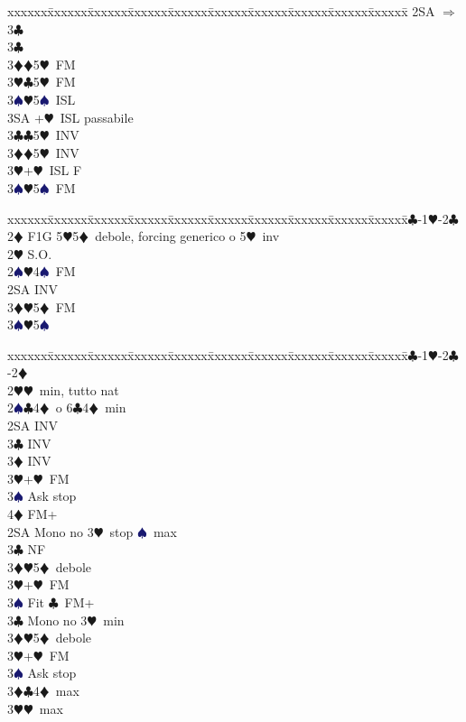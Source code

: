 \documentclass[a4paper,italian]{article}
\newcommand{\BC}{\textcolor{OliveGreen}{$\clubsuit$}}
\newcommand{\BD}{\textcolor{RedOrange}{$\vardiamondsuit$}}
\newcommand{\BH}{\textcolor{Red2}{$\varheartsuit${}}}
\newcommand{\BS}{\textcolor{MidnightBlue}{$\spadesuit${}}}
\newenvironment{bidtable}
{\begin{tabbing}

    xxxxxx\=xxxxxx\=xxxxxx\=xxxxxx\=xxxxxx\=xxxxxx\=xxxxxx\=xxxxxx\=xxxxxx\=xxxxxx\=\kill}
{\end{tabbing} }%
\begin{document}
\begin{multicols}{2}
\begin{bidtable}
        2SA \> $\Rightarrow$ 3\BC \+\\
        3\BC\+\\
        3\BD {}\BD 5\BH\ FM\\
        3\BH {}\BC 5\BH\ FM\\
        3\BS {}\BH 5\BS\ ISL\\
        3SA +\BH\ ISL passabile\-\-\\
        3\BC {}\BC 5\BH\ INV\\
        3\BD {}\BD 5\BH\ INV\\
        3\BH {}+\BH\ ISL F\\
        3\BS {}\BH 5\BS\ FM\-
    \end{bidtable}
    \bigbreak
    \begin{bidtable}
        1\BC-1\BH-2\BC\+\\
        2\BD \> F1G 5\BH 5\BD\ debole, forcing generico o 5\BH\ inv\\
        2\BH \> S.O.\\
        2\BS {}\BH 4\BS\ FM\\
        2SA \> INV\\
        3\BD {}\BH 5\BD\ FM\\
        3\BS {}\BH 5\BS \-
    \end{bidtable}
    \bigbreak
    \begin{bidtable}
        1\BC-1\BH-2\BC-2\BD\+\\
        2\BH {}\BH\ min, tutto nat\\
        2\BS {}\BC 4\BD\ o 6\BC 4\BD\ min\+\\
        2SA \> INV\\
        3\BC \> INV\\
        3\BD \> INV\\
        3\BH {}+\BH\ FM\\
        3\BS \> Ask stop\\
        4\BD \> FM+\-\\
        2SA \> Mono no 3\BH\ stop \BS\ max\+\\
        3\BC \> NF\\
        3\BD {}\BH 5\BD\ debole\\
        3\BH {}+\BH\ FM\\
        3\BS \> Fit \BC\ FM+\-\\
        3\BC \> Mono no 3\BH\ min\+\\
        3\BD {}\BH 5\BD\ debole\\
        3\BH {}+\BH\ FM\\
        3\BS \> Ask stop\-\\
        3\BD {}\BC 4\BD\ max\\
        3\BH {}\BH\ max\-
    \end{bidtable}


\end{multicols}
\end{document}
